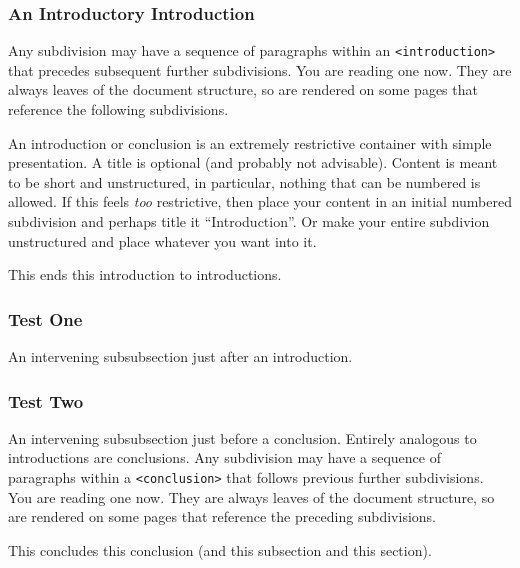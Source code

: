 \documentclass[10pt,]{article}
\theoremstyle{plain}
\theoremstyle{definition}
\theoremstyle{definition}
\theoremstyle{definition}
\theoremstyle{definition}
\theoremstyle{definition}
\theoremstyle{definition}
\numberwithin{equation}{section}
\begin{document}
\subsubsection*{An Introductory Introduction}
\hypertarget{p-133}{}%
Any subdivision may have a sequence of paragraphs within an \lstinline?<introduction>? that precedes subsequent further subdivisions.  You are reading one now.  They are always leaves of the document structure, so are rendered on some pages that reference the following subdivisions.%
\par
\hypertarget{p-134}{}%
An introduction or conclusion is an extremely restrictive container with simple presentation.  A title is optional (and probably not advisable).  Content is meant to be short and unstructured, in particular, nothing that can be numbered is allowed.  If this feels \emph{too} restrictive, then place your content in an initial numbered subdivision and perhaps title it ``Introduction''.  Or make your entire subdivion unstructured and place whatever you want into it.%
\par
\hypertarget{p-135}{}%
This ends this introduction to introductions.%
\typeout{************************************************}
\typeout{************************************************}
\subsubsection[{Test One}]{Test One}\label{subsubsection-4}
\hypertarget{p-136}{}%
An intervening subsubsection just after an introduction.%
\typeout{************************************************}
\typeout{************************************************}
\subsubsection[{Test Two}]{Test Two}\label{subsubsection-5}
\hypertarget{p-137}{}%
An intervening subsubsection just before a conclusion.%
\bigbreak
\hypertarget{p-138}{}%
Entirely analogous to introductions are conclusions.  Any subdivision may have a sequence of paragraphs within a \lstinline?<conclusion>? that follows previous further subdivisions.  You are reading one now.  They are always leaves of the document structure, so are rendered on some pages that reference the preceding subdivisions.%
\par
\hypertarget{p-139}{}%
This concludes this conclusion (and this subsection and this section).%
\typeout{************************************************}
\typeout{************************************************}
\end{document}
